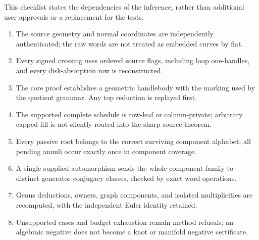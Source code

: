 \documentclass[11pt,a4paper]{article}
\theoremstyle{definition}
\theoremstyle{remark}
\begin{document}
This checklist states the dependencies of the inference, rather than
additional user approvals or a replacement for the tests.
\begin{enumerate}
\item The source geometry and normal coordinates are independently
authenticated; the raw words are not treated as embedded curves by fiat.
\item Every signed crossing uses ordered source flags, including loop
one-handles, and every disk-absorption row is reconstructed.
\item The core proof establishes a geometric handlebody with the marking
used by the quotient grammar. Any top reduction is replayed first.
\item The supported complete schedule is row-leaf or column-private;
arbitrary capped fill is not silently routed into the sharp source theorem.
\item Every passive root belongs to the correct surviving component
alphabet; all pending annuli occur exactly once in component coverage.
\item A single supplied automorphism sends the whole component family to
distinct generator conjugacy classes, checked by exact word operations.
\item Genus deductions, owners, graph components, and isolated multiplicities
are recomputed, with the independent Euler identity retained.
\item Unsupported cases and budget exhaustion remain method refusals; an
algebraic negative does not become a knot or manifold negative certificate.
\end{enumerate}

\begingroup
\small
\setlength{\bibsep}{3pt}
\setlength{\parskip}{0pt}


\endgroup
\end{document}
